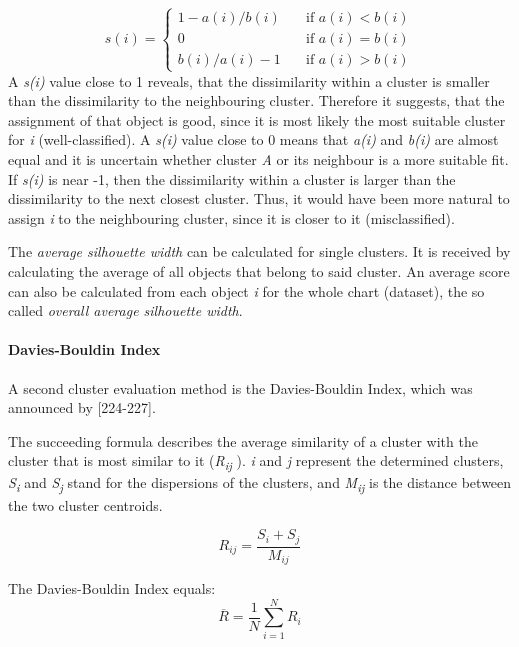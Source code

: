   \[ s(i) =
  \begin{cases}
    1 - a(i)/b(i)       & \quad \text{if } a(i) < b(i)\\
    0       & \quad \text{if } a(i) = b(i)\\
 b(i)/a(i) - 1      & \quad \text{if } a(i) > b(i)

  \end{cases}
\]
A \textit{s(i)} value close to 1 reveals, that the dissimilarity within a cluster is smaller than the dissimilarity to the neighbouring cluster. Therefore it suggests, that the assignment of that object is good, since it is most likely the most suitable cluster for \textit{i} (well-classified). A \textit{s(i)} value close to 0 means that \textit{a(i)} and \textit{b(i)} are almost equal and it is uncertain whether cluster \textit{A} or its neighbour is a more suitable fit. If \textit{s(i)} is near -1, then the dissimilarity within a cluster is larger than the dissimilarity to the next closest cluster. Thus, it would have been more natural to assign \textit{i} to the neighbouring cluster, since it is closer to it (misclassified).

The \textit{average silhouette width} can be calculated for single clusters. It is received by calculating the average of all objects that belong to said cluster. An average score can also be calculated from each object \textit{i} for the whole chart (dataset), the so called \textit{overall average silhouette width}. 


\paragraph{Davies-Bouldin Index}
A second cluster evaluation method is the Davies-Bouldin Index, which was announced by \textcite{DaviesBouldin}[224-227]. 

The succeeding formula describes the average similarity of a cluster with the cluster that is most similar to it (\textit{R\textsubscript{ij}} ).
\textit{i} and \textit{j} represent the determined clusters, \textit{S\textsubscript{i}} and \textit{S\textsubscript{j}} stand for the dispersions of the clusters, and \textit{M\textsubscript{ij}} is the distance between the two cluster centroids. 

\[
  R_{ij} = \frac{S_i + S_j}{M_{ij}}  
\]

The Davies-Bouldin Index equals:
\[
\overline{R} = \frac{1}{N}\sum_{i=1}^{N}R_i
\]

